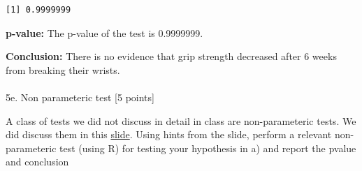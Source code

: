 \documentclass[
  letterpaper,
  DIV=11,
  numbers=noendperiod]{scrartcl}
\makeatletter
\let\oldparagraph\paragraph
\renewcommand{\paragraph}{
    \@ifstar
      \xxxParagraphStar
      \xxxParagraphNoStar
  }
\newcommand{\xxxParagraphStar}[1]{\oldparagraph*{#1}\mbox{}}
\newcommand{\xxxParagraphNoStar}[1]{\oldparagraph{#1}\mbox{}}
\newenvironment{Shaded}{\begin{snugshade}}{\end{snugshade}}
\newcommand{\AttributeTok}[1]{\textcolor[rgb]{0.40,0.45,0.13}{#1}}
\newcommand{\CommentTok}[1]{\textcolor[rgb]{0.37,0.37,0.37}{#1}}
\newcommand{\ConstantTok}[1]{\textcolor[rgb]{0.56,0.35,0.01}{#1}}
\newcommand{\FunctionTok}[1]{\textcolor[rgb]{0.28,0.35,0.67}{#1}}
\newcommand{\NormalTok}[1]{\textcolor[rgb]{0.00,0.23,0.31}{#1}}
\newcommand{\OtherTok}[1]{\textcolor[rgb]{0.00,0.23,0.31}{#1}}
\newcommand{\SpecialCharTok}[1]{\textcolor[rgb]{0.37,0.37,0.37}{#1}}
\newcommand{\StringTok}[1]{\textcolor[rgb]{0.13,0.47,0.30}{#1}}
\makeatother
\begin{document}
\begin{Shaded}
\end{Shaded}

\begin{verbatim}
[1] 0.9999999
\end{verbatim}

\textbf{p-value:} The p-value of the test is 0.9999999.

\textbf{Conclusion:} There is no evidence that grip strength decreased
after 6 weeks from breaking their wrists.

\paragraph{5e. Non parameteric test {[}5
points{]}}\label{e.-non-parameteric-test-5-points}

A class of tests we did not discuss in detail in class are
non-parameteric tests. We did discuss them in this
\href{https://docs.google.com/presentation/d/15kxh03hVBR1ybnuBBvbT5pfInju1IVkmVH1trWbKJn4/edit\#slide=id.g200cc23746fa5c2a_79}{slide}.
Using hints from the slide, perform a relevant non-parameteric test
(using R) for testing your hypothesis in a) and report the pvalue and
conclusion

\begin{Shaded}
\end{Shaded}
\end{document}
